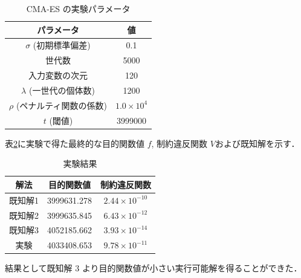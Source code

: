 \documentclass[twocolumn]{jarticle}
\begin{document}
\begin{table}[htbp]
    \begin{center}
        \caption{CMA-ES の実験パラメータ}
        \label{setting_cmaes}
        \begin{tabular}{| c | c |} 
            \hline
            パラメータ & 値 \\ 
            \hline
            $\sigma$ (初期標準偏差) &  0.1 \\
            世代数 & 5000 \\
            入力変数の次元 & 120 \\
            $\lambda$ (一世代の個体数) & 1200 \\
            $\rho$ (ペナルティ関数の係数) & $1.0\times10^{4}$\\
            $t$ (閾値) & 3999000 \\
            \hline
        \end{tabular}
    \end{center}
\end{table}

表\ref{result}に実験で得た最終的な目的関数値 $f$, 制約違反関数 $V$および既知解を示す．
\begin{table}[htbp]
    \begin{center}
        \caption{実験結果}
        \label{result}
        \begin{tabular}{|c|c|c|}
            \hline
            解法 & 目的関数値 & 制約違反関数 \\ 
            \hline
            既知解1 & 3999631.278 & $2.44 \times 10^{-10}$ \\
            既知解2 & 3999635.845 & $6.43 \times 10^{-12}$ \\
            既知解3 & 4052185.662 & $3.93 \times 10^{-14}$ \\
            実験    & 4033408.653 & $9.78 \times 10^{-11}$ \\
            \hline
        \end{tabular}
    \end{center}
\end{table}
結果として既知解 3 より目的関数値が小さい実行可能解を得ることができた．
\end{document}
